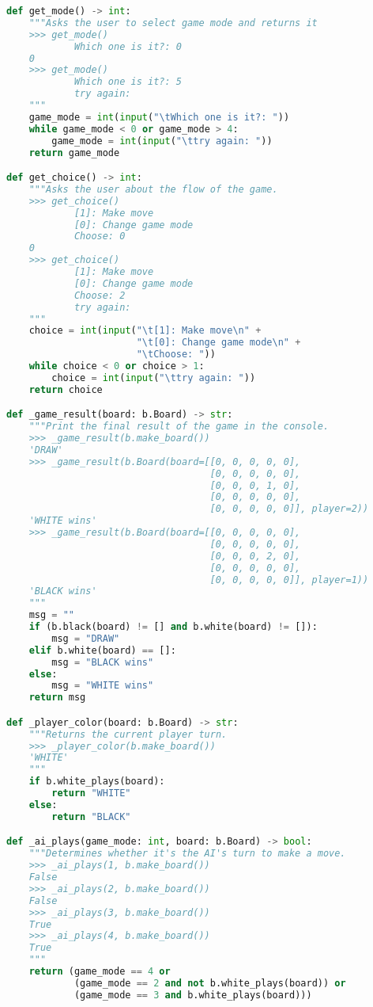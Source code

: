 \documentclass{article}
\begin{document}
\begin{lstlisting}[language=Python, caption={kildekode}, label={code:kildekode}]
def get_mode() -> int:
    """Asks the user to select game mode and returns it
    >>> get_mode()
            Which one is it?: 0
    0
    >>> get_mode()
            Which one is it?: 5
            try again:
    """
    game_mode = int(input("\tWhich one is it?: "))
    while game_mode < 0 or game_mode > 4:
        game_mode = int(input("\ttry again: "))
    return game_mode

def get_choice() -> int:
    """Asks the user about the flow of the game.
    >>> get_choice()
            [1]: Make move
            [0]: Change game mode
            Choose: 0
    0
    >>> get_choice()
            [1]: Make move
            [0]: Change game mode
            Choose: 2
            try again:
    """
    choice = int(input("\t[1]: Make move\n" +  
                       "\t[0]: Change game mode\n" +
                       "\tChoose: "))
    while choice < 0 or choice > 1:
        choice = int(input("\ttry again: "))
    return choice

def _game_result(board: b.Board) -> str:
    """Print the final result of the game in the console.
    >>> _game_result(b.make_board())
    'DRAW'
    >>> _game_result(b.Board(board=[[0, 0, 0, 0, 0], 
                                    [0, 0, 0, 0, 0], 
                                    [0, 0, 0, 1, 0], 
                                    [0, 0, 0, 0, 0], 
                                    [0, 0, 0, 0, 0]], player=2))
    'WHITE wins'
    >>> _game_result(b.Board(board=[[0, 0, 0, 0, 0], 
                                    [0, 0, 0, 0, 0], 
                                    [0, 0, 0, 2, 0], 
                                    [0, 0, 0, 0, 0], 
                                    [0, 0, 0, 0, 0]], player=1))
    'BLACK wins'
    """
    msg = ""
    if (b.black(board) != [] and b.white(board) != []):
        msg = "DRAW"
    elif b.white(board) == []:
        msg = "BLACK wins"
    else:
        msg = "WHITE wins"
    return msg

def _player_color(board: b.Board) -> str:
    """Returns the current player turn.
    >>> _player_color(b.make_board())
    'WHITE'
    """
    if b.white_plays(board):
        return "WHITE"
    else:
        return "BLACK"

def _ai_plays(game_mode: int, board: b.Board) -> bool:
    """Determines whether it's the AI's turn to make a move.
    >>> _ai_plays(1, b.make_board())
    False
    >>> _ai_plays(2, b.make_board())
    False
    >>> _ai_plays(3, b.make_board())
    True
    >>> _ai_plays(4, b.make_board())
    True
    """
    return (game_mode == 4 or 
            (game_mode == 2 and not b.white_plays(board)) or 
            (game_mode == 3 and b.white_plays(board)))


\end{lstlisting}
\end{document}
